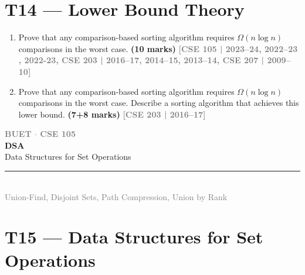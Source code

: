 \documentclass[12pt,a3paper]{article}
\newcommand{\yr}[1]{\hfill\textcolor{gray}{\small\textbf{[#1]}}}
\newcommand{\mk}[1]{\textcolor{orange!70!black}{\small\textbf{(#1 marks)}}}
\newcommand{\secdivider}[4]{%
  \newpage\thispagestyle{empty}%
  \vspace*{\fill}%
  \begin{tcolorbox}[enhanced,colback=#4!7,colframe=#3,boxrule=1.5pt,arc=8pt,
    left=20pt,right=20pt,top=22pt,bottom=22pt,
    shadow={3pt}{-3pt}{0pt}{black!15}]
    \centering
    {\large\textcolor{gray}{\textbf{BUET $\cdot$ CSE 105}}}\\[8pt]
    {\fontsize{26}{32}\selectfont\bfseries\textcolor{#3}{DSA}}\\[6pt]
    {\fontsize{15}{19}\selectfont\textcolor{dgray}{#1}}\\[12pt]
    \textcolor{#3!60}{\rule{0.5\textwidth}{0.5pt}}\\[6pt]
    {\small\textcolor{gray}{#2}}
  \end{tcolorbox}%
  \vspace*{\fill}\newpage%
}
\begin{document}
\section{T14 --- Lower Bound Theory}

\begin{enumerate}
\item Prove that any comparison-based sorting algorithm requires $\Omega(n \log n)$ comparisons in the worst case. \mk{10}
\yr{CSE 105 | 2023--24, 2022--23 , 2022-23, CSE 203 | 2016--17, 2014--15, 2013--14, CSE 207 | 2009--10}

\item Prove that any comparison-based sorting algorithm requires $\Omega(n \log n)$ comparisons in the worst case. Describe a sorting algorithm that achieves this lower bound. \mk{7+8}
\yr{CSE 203 | 2016--17}

\end{enumerate}
\newpage

\secdivider{Data Structures for Set Operations}{Union-Find, Disjoint Sets, Path Compression, Union by Rank}{cH}{cH}
\label{sec:T15}
\section{T15 --- Data Structures for Set Operations}
\end{document}

